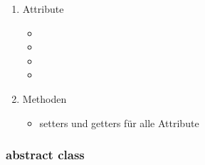 \documentclass[a4paper]{scrreprt}
\begin{document}
                    \begin{enumerate}
                        \item Attribute
                            \begin{itemize}
                                \item {}
                                \item {}
                                \item {}
                                \item {}
                            \end{itemize}
                        \item Methoden
                            \begin{itemize}
                                \item setters und getters für alle Attribute
                            \end{itemize}
                    \end{enumerate}

                \subsubsection{abstract class } %
\end{document}
